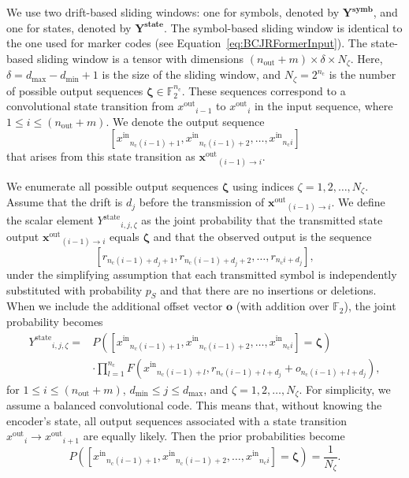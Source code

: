 \documentclass[conference,letterpaperu]{IEEEtran}
\newcommand{\psub}{\ensuremath{p_S}}
\newcommand{\yout}{\ensuremath{\bm{x}^{\text{out}}}}
\newcommand{\yinIx}{\ensuremath{x^{\text{in}}}}
\newcommand{\youtIx}{\ensuremath{x^{\text{out}}}}
\newcommand{\YStateVal}{\ensuremath{\bm{\zeta}}}
\newcommand{\YStateValIx}{\ensuremath{\zeta}}
\newcommand{\nout}{\ensuremath{n_{\text{out}}}}
\newcommand{\recIx}{\ensuremath{r}}
\newcommand{\dfrom}{\ensuremath{d}}
\newcommand{\bcjrformerInputBit}{\ensuremath{\bm{Y^{\text{symb}}}}}
\newcommand{\bcjrformerInputState}{\ensuremath{\bm{Y^{\text{state}}}}}
\newcommand{\bcjrformerInputStateIx}{\ensuremath{Y^{\text{state}}}}
\newcommand{\convn}{\ensuremath{n_\text{c}}}
\newcommand{\noutput}{\ensuremath{N_{\YStateValIx}}}
\newcommand{\offsetIx}{\ensuremath{o}}
\begin{document}
We use two drift-based sliding windows: one for symbols, denoted by $\bcjrformerInputBit$, and one for states, denoted by $\bcjrformerInputState$. The symbol-based sliding window is identical to the one used for marker codes (see Equation~\eqref{eq:BCJRFormerInput}). The state-based sliding window is a tensor with dimensions $(\nout + m) \times \delta \times \noutput$. Here, $\delta = \dfrom_{\max} - \dfrom_{\min} + 1 $ is the size of the sliding window, and $\noutput = 2^{\convn}$ is the number of possible output sequences $\YStateVal \in \mathbb{F}_2^{\convn}$. These sequences correspond to a convolutional state transition from $\youtIx_{i-1}$ to $\youtIx_{i}$ in the input sequence, where $1 \leq i \leq (\nout + m)$. We denote the output sequence 
$$[\yinIx_{\convn(i-1) + 1}, \yinIx_{\convn(i-1)+ 2}, \ldots, \yinIx_{\convn i}]$$
that arises from this state transition as $\yout_{(i-1) \rightarrow i}$. 

We enumerate all possible output sequences $\YStateVal$ using indices $\YStateValIx = 1, 2, \ldots, \noutput$. Assume that the drift is $\dfrom_j$ before the transmission of $\yout_{(i-1) \rightarrow i}$. We define the scalar element $\bcjrformerInputStateIx_{i, j, \YStateValIx}$ as the joint probability that the transmitted state output $\yout_{(i-1) \rightarrow i}$ equals $\bm{\YStateVal}$ and that the observed output is the sequence $$[\recIx_{\convn(i-1) + \dfrom_j + 1}, \recIx_{\convn(i-1) + \dfrom_j + 2}, \ldots , \recIx_{\convn i + \dfrom_j}],$$ under the simplifying assumption that each transmitted symbol is independently substituted with probability $\psub$ and that there are no insertions or deletions. When we include the additional offset vector $\bm{o}$ (with addition over $\mathbb{F}_2$), the joint probability becomes 
\begin{align*}
    \bcjrformerInputStateIx_{i, j, \YStateValIx}=&P([\yinIx_{\convn(i-1) + 1}, \yinIx_{\convn(i-1)+ 2}, \ldots ,\yinIx_{\convn i}] = \bm{\YStateVal}) \\
    &\cdot \prod_{l=1}^{\convn} F(\yinIx_{\convn(i-1) + l}, \recIx_{\convn(i-1) + l + \dfrom_j} + \offsetIx_{\convn(i-1) + l + \dfrom_j}),
\end{align*} for $1 \leq i \leq (\nout + m)$, $\dfrom_{\min} \leq j \leq \dfrom_{\max}$, and $\YStateValIx = 1, 2, \ldots, \noutput$. 
For simplicity, we assume a balanced convolutional code. This means that, without knowing the encoder's state, all output sequences associated with a state transition $\youtIx_i \rightarrow \youtIx_{i+1}$ are equally likely. Then the prior probabilities become
$$P([\yinIx_{\convn(i-1) + 1}, \yinIx_{\convn(i-1)+ 2}, \ldots, \yinIx_{\convn i}] = \YStateVal) = \frac{1}{\noutput}.$$
\end{document}

